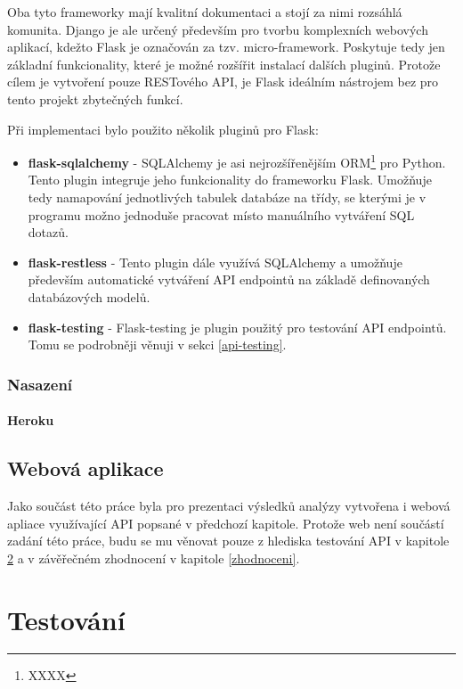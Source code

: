 \documentclass[thesis=B,czech]{FITthesis}[2012/06/26]
\begin{document}
	Oba tyto frameworky mají kvalitní dokumentaci a stojí za nimi rozsáhlá komunita. Django je ale určený především pro tvorbu komplexních webových aplikací, kdežto Flask je označován za tzv. micro-framework. Poskytuje tedy jen základní funkcionality, které je možné rozšířit instalací dalších pluginů. Protože cílem je vytvoření pouze RESTového API, je Flask ideálním nástrojem bez pro tento projekt zbytečných funkcí. 
	
\noindent Při implementaci bylo použito několik pluginů pro Flask:
	
\begin{itemize}
\item \textbf{flask-sqlalchemy} - SQLAlchemy je asi nejrozšířenějším ORM\footnote{XXXX} pro Python. Tento plugin integruje jeho funkcionality do frameworku Flask. Umožňuje tedy namapování jednotlivých tabulek databáze na třídy, se kterými je v programu možno jednoduše pracovat místo manuálního vytváření SQL dotazů. 
\item \textbf{flask-restless} - Tento plugin dále využívá SQLAlchemy a umožňuje především automatické vytváření API endpointů na základě definovaných databázových modelů. 
\item \textbf{flask-testing} - Flask-testing je plugin použitý pro testování API endpointů. Tomu se podrobněji věnuji v sekci \ref{api-testing}.
\end{itemize}

\subsection{Nasazení}
\subsubsection{Heroku}


\section{Webová aplikace}
	Jako součást této práce byla pro prezentaci výsledků analýzy vytvořena i webová apliace využívající API popsané v předchozí kapitole. Protože web není součástí zadání této práce, budu se mu věnovat pouze z hlediska testování API v kapitole \ref{testovani} a v závěřečném zhodnocení v kapitole \ref{zhodnoceni}. 


\chapter{Testování}
\label{testovani}
\end{document}
